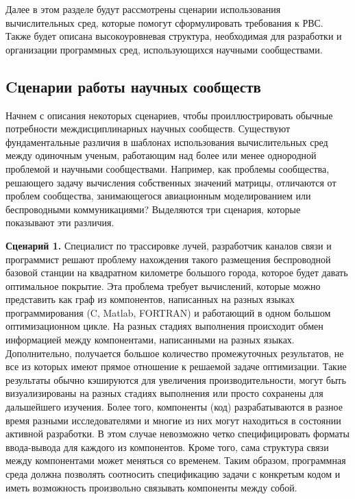 Далее в этом разделе будут рассмотрены сценарии использования вычислительных сред, которые помогут сформулировать требования к РВС. Также будет описана высокоуровневая структура, необходимая для разработки и организации программных сред, использующихся научными сообществами.

\subsection{Cценарии работы научных сообществ}
\label{scenarios}

Начнем с описания некоторых сценариев, чтобы проиллюстрировать обычные потребности междисциплинарных научных сообществ. Существуют фундаментальные различия в шаблонах использования вычислительных сред между одиночным ученым, работающим над более или менее однородной проблемой и научными сообществами. Например, как проблемы сообщества, решающего задачу вычисления собственных значений матрицы, отличаются от проблем сообщества, занимающегося авиационным моделированием или беспроводными коммуникациями? Выделяются три сценария, которые показывают эти различия.

\textbf{Сценарий 1.} Специалист по трассировке лучей, разработчик каналов связи и программист решают проблему нахождения такого размещения беспроводной базовой станции на квадратном километре большого города, которое будет давать оптимальное покрытие. Эта проблема требует вычислений, которые можно представить как граф из компонентов, написанных на разных языках программирования (C, Matlab, FORTRAN) и работающий в одном большом оптимизационном цикле. На разных стадиях выполнения происходит обмен информацией между компонентами, написанными на разных языках. Дополнительно, получается большое количество промежуточных результатов, не все из которых имеют прямое отношение к решаемой задаче оптимизации. Такие результаты обычно кэшируются для увеличения производительности, могут быть визуализированы на разных стадиях выполнения или просто сохранены для дальшейшего изучения. Более того, компоненты (код) разрабатываются в разное время разными исследователями и многие из них могут находиться в состоянии активной разработки. В этом случае невозможно четко специфицировать форматы ввода-вывода для каждого из компонентов. Кроме того, сама структура связи между компонентами может меняться со временем. Таким образом, программная среда должна позволять соотносить спецификацию задачи с конкретым кодом и иметь возможность произвольно связывать компоненты между собой.

